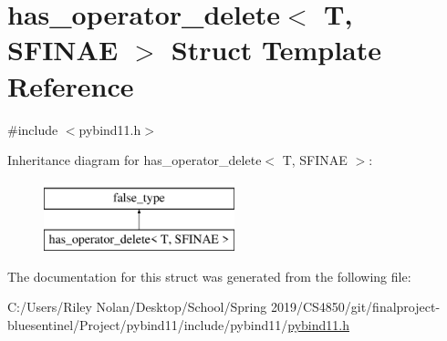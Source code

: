\hypertarget{structhas__operator__delete}{}\section{has\+\_\+operator\+\_\+delete$<$ T, S\+F\+I\+N\+AE $>$ Struct Template Reference}
\label{structhas__operator__delete}


{\ttfamily \#include $<$pybind11.\+h$>$}

Inheritance diagram for has\+\_\+operator\+\_\+delete$<$ T, S\+F\+I\+N\+AE $>$\+:\begin{figure}[H]
\begin{center}
\leavevmode
\includegraphics[height=2.000000cm]{structhas__operator__delete}
\end{center}
\end{figure}


The documentation for this struct was generated from the following file\+:\begin{DoxyCompactItemize}
\item 
C\+:/\+Users/\+Riley Nolan/\+Desktop/\+School/\+Spring 2019/\+C\+S4850/git/finalproject-\/bluesentinel/\+Project/pybind11/include/pybind11/\mbox{\hyperlink{pybind11_8h}{pybind11.\+h}}\end{DoxyCompactItemize}

